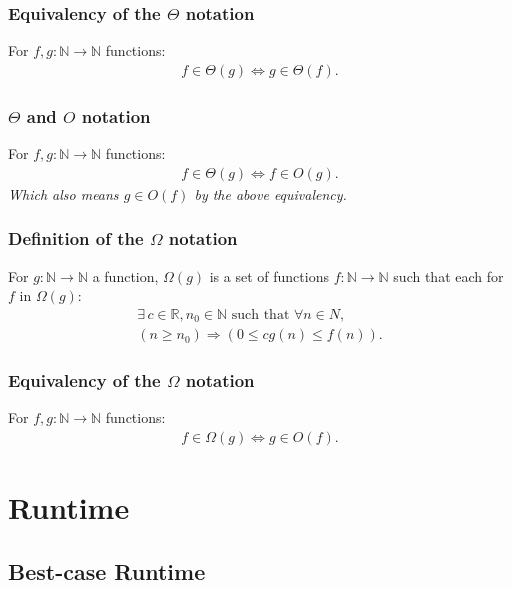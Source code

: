 \documentclass[a4paper, 12pt, twoside]{article}
\begin{document}
\subsubsection{Equivalency of the $\Theta$ notation}

For $f, g : \mathbb{N} \to \mathbb{N}$ functions:
\begin{gather*}
      f \in \Theta(g) \Longleftrightarrow g \in \Theta(f).
\end{gather*}

\subsubsection{$\Theta$ and $O$ notation}
For $f, g : \mathbb{N} \to \mathbb{N}$ functions:
\begin{gather*}
      f \in \Theta(g) \Longleftrightarrow f \in O(g).
\end{gather*}
\textit{Which also means $g \in O(f)$ by the above equivalency.}

\subsubsection{Definition of the $\Omega$ notation}

For $g : \mathbb{N} \to \mathbb{N}$ a function, $\Omega(g)$ is a set of
functions $f : \mathbb{N} \to \mathbb{N}$ such that each for
$f$ in $\Omega(g)$:
\begin{gather*}
      \exists \, c \in \mathbb{R}, n_0 \in \mathbb{N}
      \text{ such that } \forall n \in N, \\
      (n \geq n_0) \Rightarrow (0 \leq cg(n) \leq f(n)).
\end{gather*}

\subsubsection{Equivalency of the $\Omega$ notation}

For $f, g : \mathbb{N} \to \mathbb{N}$ functions:
\begin{gather*}
      f \in \Omega(g) \Longleftrightarrow g \in O(f).
\end{gather*}

\newpage

\section{Runtime}

\subsection{Best-case Runtime}
\end{document}
